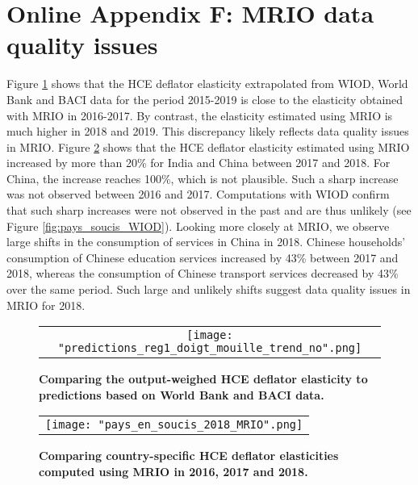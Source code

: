 \documentclass[11pt,a4paper]{article} %
\begin{document}
\newpage
\section*{Online Appendix F: MRIO data quality issues}

Figure \ref{fig:panel_pred3} shows that the HCE deflator elasticity extrapolated from WIOD, World Bank and BACI data for the period 2015-2019 is close to the elasticity obtained with MRIO in 2016-2017. By contrast, the elasticity estimated using MRIO is much higher in 2018 and 2019. 
This discrepancy likely reflects data quality issues in MRIO.
Figure \ref{fig:pays_soucis_MRIO} shows that the HCE deflator elasticity estimated using MRIO increased by more than 20\% for India and China between 2017 and 2018.
For China, the increase reaches 100\%, which is not plausible.
Such a sharp increase was not observed between 2016 and 2017. 
Computations with WIOD confirm that such sharp increases were not observed in the past and are thus unlikely (see Figure \ref{fig:pays_soucis_WIOD}).
Looking more closely at MRIO, we observe large shifts in the consumption of services in China in 2018. 
Chinese households’ consumption of Chinese education services increased by 43\% between 2017 and 2018, whereas the consumption of Chinese transport services decreased by 43\% over the same period. 
Such large and unlikely shifts suggest data quality issues in MRIO for 2018. 

\begin{figure}[H]
	\centering
	\caption{\footnotesize{\textbf{Comparing the output-weighed HCE deflator elasticity to predictions based on World Bank and BACI data.}}}
	\begin{tabular}{c}
		\texttt{[image: "predictions\_reg1\_doigt\_mouille\_trend\_no".png]}\\
	\end{tabular}
	\label{fig:panel_pred3}
\end{figure}

\begin{figure}[H]
	\centering
	\caption{\footnotesize{\textbf{Comparing country-specific HCE deflator elasticities computed using MRIO in 2016, 2017 and 2018.}}}
	\begin{tabular}{c}
		\texttt{[image: "pays\_en\_soucis\_2018\_MRIO".png]}\\
	\end{tabular}
	\label{fig:pays_soucis_MRIO}
\end{figure}
\end{document}
